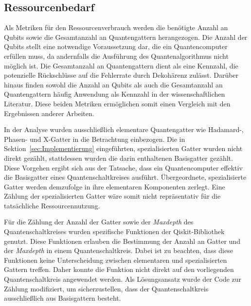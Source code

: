 \subsection*{Ressourcenbedarf}
Als Metriken für den Ressourcenverbrauch werden die benötigte Anzahl an Qubits sowie die Gesamtanzahl an Quantengattern herangezogen. 
Die Anzahl der Qubits stellt eine notwendige Voraussetzung dar, 
die ein Quantencomputer erfüllen muss, da andernfalls die Ausführung des Quantenalgorithmus nicht möglich ist. 
Die Gesamtanzahl an Quantengattern dient als eine Kennzahl, 
die potenzielle Rückschlüsse auf die Fehlerrate durch Dekohärenz zulässt. 
Darüber hinaus finden sowohl die Anzahl an Qubits als auch die Gesamtanzahl an Quantengattern häufig Anwendung als Kennzahl in der wissenschaftlichen Literatur. 
Diese beiden Metriken ermöglichen somit einen Vergleich mit den Ergebnissen anderer Arbeiten.

In der Analyse wurden ausschließlich elementare Quantengatter wie Hadamard-, Phasen- und X-Gatter in die Betrachtung einbezogen. 
Die in Sektion~\ref{sec:Implementierung} eingeführten, spezialisierten Gatter wurden nicht direkt gezählt, 
stattdessen wurden die darin enthaltenen Basisgatter gezählt. 
Diese Vorgehen ergibt sich aus der Tatsache, dass ein Quantencomputer effektiv die Basisgatter eines Quantenschaltkreises ausführt. 
Übergeordnete, spezialisierte Gatter werden demzufolge in ihre elementaren Komponenten zerlegt. 
Eine Zählung der spezialisierten Gatter wäre somit nicht repräsentativ für die tatsächliche Ressourcennutzung.

Für die Zählung der Anzahl der Gatter sowie der \textit{Maxdepth} des Quantenschaltkreises wurden spezifische Funktionen der Qiskit-Bibliothek genutzt. 
Diese Funktionen erlauben die Bestimmung der Anzahl an Gatter und der \textit{Maxdepth} in einem Quantenschaltkreis.
Dabei ist zu beachten, dass diese Funktionen keine Unterscheidung zwischen elementaren und spezialisierten Gattern treffen.
Daher konnte die Funktion nicht direkt auf den vorliegenden Quantenschaltkreis angewendet werden. 
Als Lösungsansatz wurde der Code zur Zählung modifiziert, um sicherzustellen, dass der Quantenschaltkreis ausschließlich aus Basisgattern besteht.

